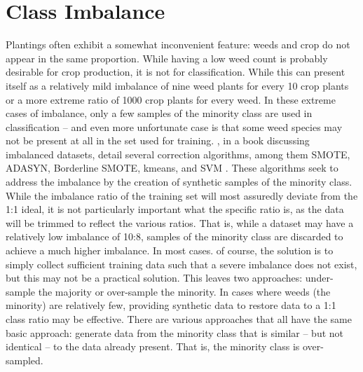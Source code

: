 \documentclass[letterpaper]{article}
\begin{document}
{\section{Class Imbalance}
Plantings often exhibit a somewhat inconvenient feature: weeds and crop do not appear in the same proportion. While having a low weed count is probably desirable for crop production, it is not for classification. While this can present itself as a relatively mild imbalance of nine weed plants for every 10 crop plants or a more extreme ratio of 1000 crop plants for every weed. In these extreme cases of imbalance, only a few samples of the minority class are used in classification -- and even more unfortunate case is that some weed species may not be present at all in the set used for training. \citeauthor{Fernandez2018-fw}, in a book discussing imbalanced datasets, detail several correction algorithms, among them SMOTE, ADASYN, Borderline SMOTE, kmeans, and SVM \parencite{Fernandez2018-fw}. These algorithms seek to address the imbalance by the creation of synthetic samples of the minority class. While the imbalance ratio of the training set will most assuredly deviate from the 1:1 ideal, it is not particularly important what the specific ratio is, as the data will be trimmed to reflect the various ratios. That is, while a dataset may have a relatively low imbalance of 10:8, samples of the minority class are discarded to achieve a much higher imbalance. In most cases. of course, the solution is to simply collect sufficient training data such that a severe imbalance does not exist, but this may not be a practical solution. This leaves two approaches: under-sample the majority or over-sample the minority. In cases where weeds (the minority) are relatively few, providing synthetic data to restore data to a 1:1 class ratio may be effective. There are various approaches that all have the same basic approach: generate data from the minority class that is similar -- but not identical -- to the data already present. That is, the minority class is over-sampled.
}
\end{document}
